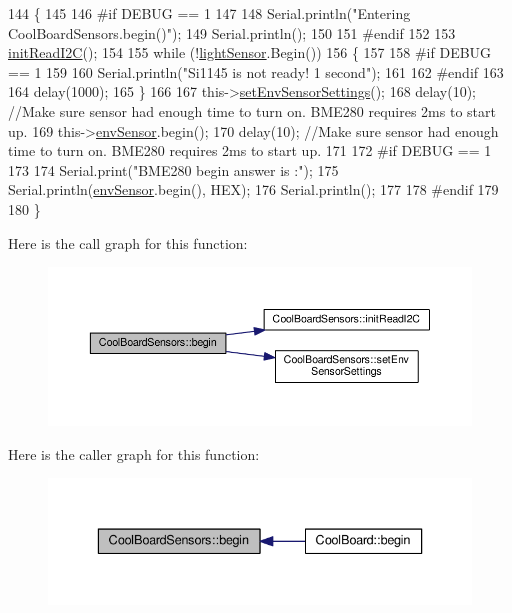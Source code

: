 \begin{DoxyCode}
144 \{  
145 
146 \textcolor{preprocessor}{#if DEBUG == 1 }
147      
148     Serial.println(\textcolor{stringliteral}{"Entering CoolBoardSensors.begin()"});
149     Serial.println();
150 
151 \textcolor{preprocessor}{#endif}
152 
153     \hyperlink{classCoolBoardSensors_acad6a8418c66d36868caca23c844ecb6}{initReadI2C}();
154 
155     \textcolor{keywordflow}{while} (!\hyperlink{classCoolBoardSensors_a3e397300fb707dd193e909a757bf6102}{lightSensor}.Begin()) 
156     \{
157     
158 \textcolor{preprocessor}{    #if DEBUG == 1}
159 
160         Serial.println(\textcolor{stringliteral}{"Si1145 is not ready!  1 second"});
161 
162 \textcolor{preprocessor}{    #endif}
163 
164         delay(1000);
165     \}
166      
167     this->\hyperlink{classCoolBoardSensors_a406307ffd70272282d91479c7ed8d66f}{setEnvSensorSettings}();
168     delay(10);  \textcolor{comment}{//Make sure sensor had enough time to turn on. BME280 requires 2ms to start up.}
169     this->\hyperlink{classCoolBoardSensors_a868e38985e9a2412829fa2790ca13e2e}{envSensor}.begin();
170     delay(10);  \textcolor{comment}{//Make sure sensor had enough time to turn on. BME280 requires 2ms to start up.}
171 
172 \textcolor{preprocessor}{#if DEBUG == 1 }
173     
174     Serial.print(\textcolor{stringliteral}{"BME280 begin answer is :"});
175     Serial.println(\hyperlink{classCoolBoardSensors_a868e38985e9a2412829fa2790ca13e2e}{envSensor}.begin(), HEX);
176     Serial.println();
177 
178 \textcolor{preprocessor}{#endif}
179 
180 \}
\end{DoxyCode}
Here is the call graph for this function\+:\nopagebreak
\begin{figure}[H]
\begin{center}
\leavevmode
\includegraphics[width=350pt]{classCoolBoardSensors_a97095823ef7c8f5290812f1405b966b3_cgraph}
\end{center}
\end{figure}
Here is the caller graph for this function\+:\nopagebreak
\begin{figure}[H]
\begin{center}
\leavevmode
\includegraphics[width=336pt]{classCoolBoardSensors_a97095823ef7c8f5290812f1405b966b3_icgraph}
\end{center}
\end{figure}

